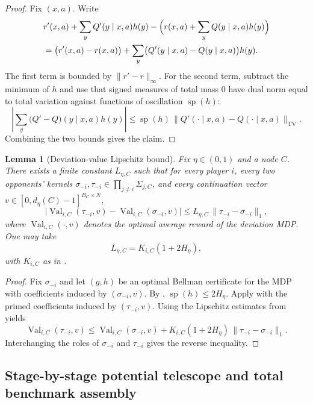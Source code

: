 \documentclass[12pt]{article}
\newtheorem{lemma}[theorem]{Lemma}
\theoremstyle{definition}
\newcommand{\1}{\mathbf{1}}
\DeclareMathOperator{\spn}{sp}
\begin{document}
\begin{proof}
Fix $(x,a)$. Write
\begin{align*}
&r'(x,a)+\sum_y Q'(y\mid x,a)h(y)
-
\Bigl(r(x,a)+\sum_y Q(y\mid x,a)h(y)\Bigr)
\\
&= \bigl(r'(x,a)-r(x,a)\bigr)
+
\sum_y\bigl(Q'(y\mid x,a)-Q(y\mid x,a)\bigr)h(y).
\end{align*}
The first term is bounded by $\|r'-r\|_\infty$. For the second term, subtract the
minimum of $h$ and use that signed measures of total mass $0$ have dual norm equal
to total variation against functions of oscillation $\spn(h)$:
\[
\left|\sum_y\bigl(Q'-Q\bigr)(y\mid x,a)h(y)\right|
\le
\spn(h)\,\|Q'(\cdot\mid x,a)-Q(\cdot\mid x,a)\|_{\mathrm{TV}}.
\]
Combining the two bounds gives the claim.
\end{proof}

\begin{lemma}[Deviation-value Lipschitz bound]
\label{lem:deviation-lipschitz}
Fix $\eta\in(0,1)$ and a node $C$. There exists a finite constant $L_{\eta,C}$
such that for every player $i$, every two opponents' kernels
$\sigma_{-i},\tau_{-i}\in\prod_{j\ne i}\Sigma_{j,C}$, and every continuation vector
$v\in[0,d_\eta(C)-1]^{B_C\times N}$,
\[
\bigl|\operatorname{Val}_{i,C}(\tau_{-i},v)-\operatorname{Val}_{i,C}(\sigma_{-i},v)\bigr|
\le L_{\eta,C}\,\|\tau_{-i}-\sigma_{-i}\|_1,
\]
where $\operatorname{Val}_{i,C}(\cdot,v)$ denotes the optimal average reward of the
deviation MDP. One may take
\[
L_{\eta,C}=K_{i,C}(1+2H_\eta),
\]
with $K_{i,C}$ as in .
\end{lemma}

\begin{proof}
Fix $\sigma_{-i}$ and let $(g,h)$ be an optimal Bellman certificate for the MDP with
coefficients induced by $(\sigma_{-i},v)$. By ,
$\spn(h)\le 2H_\eta$. Apply  with the primed
coefficients induced by $(\tau_{-i},v)$. Using the Lipschitz estimates from
 yields
\[
\operatorname{Val}_{i,C}(\tau_{-i},v)
\le
\operatorname{Val}_{i,C}(\sigma_{-i},v)
+
K_{i,C}(1+2H_\eta)\,\|\tau_{-i}-\sigma_{-i}\|_1.
\]
Interchanging the roles of $\sigma_{-i}$ and $\tau_{-i}$ gives the reverse
inequality.
\end{proof}




\subsection{Stage-by-stage potential telescope and total benchmark assembly}
\end{document}
